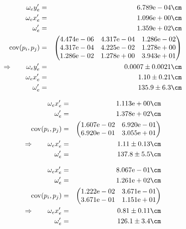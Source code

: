 \begin{eqnarray}
    \omega_e y_e' &=& 6.789\mathrm{e}-04 \cm \nonumber \\
    \omega_e x_e' &=& 1.096\mathrm{e}+00 \cm \nonumber \\
    \omega_e' &=& 1.359\mathrm{e}+02 \cm \nonumber \\
    \mathrm{cov}(p_i, p_j) &=& 
    \begin{pmatrix}
        4.474\mathrm{e}-06 &4.317\mathrm{e}-04 &1.286\mathrm{e}-02 \\
        4.317\mathrm{e}-04 &4.225\mathrm{e}-02 &1.278\mathrm{e}+00 \\
        1.286\mathrm{e}-02 &1.278\mathrm{e}+00 &3.943\mathrm{e}+01 \\
    \end{pmatrix}
\\ \Rightarrow \qquad
    \omega_e y_e' &=& 0.0007 \pm 0.0021 \cm\\
    \omega_e x_e' &=& 1.10 \pm 0.21 \cm\\
    \omega_e' &=& 135.9 \pm 6.3 \cm
\end{eqnarray}

\begin{eqnarray}
    \omega_e x_e' &=& 1.113\mathrm{e}+00 \cm \nonumber \\
    \omega_e' &=& 1.378\mathrm{e}+02 \cm \nonumber \\
    \mathrm{cov}(p_i, p_j) &=& 
    \begin{pmatrix}
        1.607\mathrm{e}-02 &6.920\mathrm{e}-01 \\
        6.920\mathrm{e}-01 &3.055\mathrm{e}+01 \\
    \end{pmatrix}
\\ \Rightarrow \qquad
    \omega_e x_e' &=& 1.11 \pm 0.13 \cm\\
    \omega_e' &=& 137.8 \pm 5.5 \cm
\end{eqnarray}

\begin{eqnarray}
    \omega_e x_e' &=& 8.067\mathrm{e}-01 \cm \nonumber \\
    \omega_e' &=& 1.261\mathrm{e}+02 \cm \nonumber \\
    \mathrm{cov}(p_i, p_j) &=& 
    \begin{pmatrix}
        1.222\mathrm{e}-02 &3.671\mathrm{e}-01 \\
        3.671\mathrm{e}-01 &1.151\mathrm{e}+01 \\
    \end{pmatrix}
\\ \Rightarrow \qquad
    \omega_e x_e' &=& 0.81 \pm 0.11 \cm\\
    \omega_e' &=& 126.1 \pm 3.4 \cm
\end{eqnarray}

